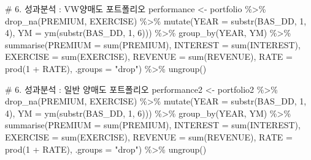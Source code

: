 \documentclass[
  a4paper,
  DIV=11,
  numbers=noendperiod]{scrreprt}
\newenvironment{Shaded}{\begin{snugshade}}{\end{snugshade}}
\newcommand{\AttributeTok}[1]{\textcolor[rgb]{0.40,0.45,0.13}{#1}}
\newcommand{\CommentTok}[1]{\textcolor[rgb]{0.37,0.37,0.37}{#1}}
\newcommand{\DecValTok}[1]{\textcolor[rgb]{0.68,0.00,0.00}{#1}}
\newcommand{\FunctionTok}[1]{\textcolor[rgb]{0.28,0.35,0.67}{#1}}
\newcommand{\NormalTok}[1]{\textcolor[rgb]{0.00,0.23,0.31}{#1}}
\newcommand{\OtherTok}[1]{\textcolor[rgb]{0.00,0.23,0.31}{#1}}
\newcommand{\SpecialCharTok}[1]{\textcolor[rgb]{0.37,0.37,0.37}{#1}}
\newcommand{\StringTok}[1]{\textcolor[rgb]{0.13,0.47,0.30}{#1}}
\begin{document}
\begin{Shaded}
\begin{Highlighting}[]
\CommentTok{\# 6. 성과분석 : VW양매도 포트폴리오}
\NormalTok{performance }\OtherTok{\textless{}{-}}\NormalTok{ portfolio }\SpecialCharTok{\%\textgreater{}\%}
  \FunctionTok{drop\_na}\NormalTok{(PREMIUM, EXERCISE) }\SpecialCharTok{\%\textgreater{}\%}
  \FunctionTok{mutate}\NormalTok{(}\AttributeTok{YEAR =} \FunctionTok{substr}\NormalTok{(BAS\_DD, }\DecValTok{1}\NormalTok{, }\DecValTok{4}\NormalTok{),}
         \AttributeTok{YM =} \FunctionTok{ym}\NormalTok{(}\FunctionTok{substr}\NormalTok{(BAS\_DD, }\DecValTok{1}\NormalTok{, }\DecValTok{6}\NormalTok{))) }\SpecialCharTok{\%\textgreater{}\%}
  \FunctionTok{group\_by}\NormalTok{(YEAR, YM) }\SpecialCharTok{\%\textgreater{}\%}
  \FunctionTok{summarise}\NormalTok{(}\AttributeTok{PREMIUM =} \FunctionTok{sum}\NormalTok{(PREMIUM),}
            \AttributeTok{INTEREST =} \FunctionTok{sum}\NormalTok{(INTEREST),}
            \AttributeTok{EXERCISE =} \FunctionTok{sum}\NormalTok{(EXERCISE),}
            \AttributeTok{REVENUE =} \FunctionTok{sum}\NormalTok{(REVENUE),}
            \AttributeTok{RATE =} \FunctionTok{prod}\NormalTok{(}\DecValTok{1} \SpecialCharTok{+}\NormalTok{ RATE),}
            \AttributeTok{.groups =} \StringTok{"drop"}\NormalTok{) }\SpecialCharTok{\%\textgreater{}\%}
  \FunctionTok{ungroup}\NormalTok{()}

\CommentTok{\# 6. 성과분석 : 일반 양매도 포트폴리오}
\NormalTok{performance2 }\OtherTok{\textless{}{-}}\NormalTok{ portfolio2 }\SpecialCharTok{\%\textgreater{}\%}
  \FunctionTok{drop\_na}\NormalTok{(PREMIUM, EXERCISE) }\SpecialCharTok{\%\textgreater{}\%}
  \FunctionTok{mutate}\NormalTok{(}\AttributeTok{YEAR =} \FunctionTok{substr}\NormalTok{(BAS\_DD, }\DecValTok{1}\NormalTok{, }\DecValTok{4}\NormalTok{),}
         \AttributeTok{YM =} \FunctionTok{ym}\NormalTok{(}\FunctionTok{substr}\NormalTok{(BAS\_DD, }\DecValTok{1}\NormalTok{, }\DecValTok{6}\NormalTok{))) }\SpecialCharTok{\%\textgreater{}\%}
  \FunctionTok{group\_by}\NormalTok{(YEAR, YM) }\SpecialCharTok{\%\textgreater{}\%}
  \FunctionTok{summarise}\NormalTok{(}\AttributeTok{PREMIUM =} \FunctionTok{sum}\NormalTok{(PREMIUM),}
            \AttributeTok{INTEREST =} \FunctionTok{sum}\NormalTok{(INTEREST),}
            \AttributeTok{EXERCISE =} \FunctionTok{sum}\NormalTok{(EXERCISE),}
            \AttributeTok{REVENUE =} \FunctionTok{sum}\NormalTok{(REVENUE),}
            \AttributeTok{RATE =} \FunctionTok{prod}\NormalTok{(}\DecValTok{1} \SpecialCharTok{+}\NormalTok{ RATE),}
            \AttributeTok{.groups =} \StringTok{"drop"}\NormalTok{) }\SpecialCharTok{\%\textgreater{}\%}
  \FunctionTok{ungroup}\NormalTok{()}


\end{Highlighting}
\end{Shaded}
\end{document}
